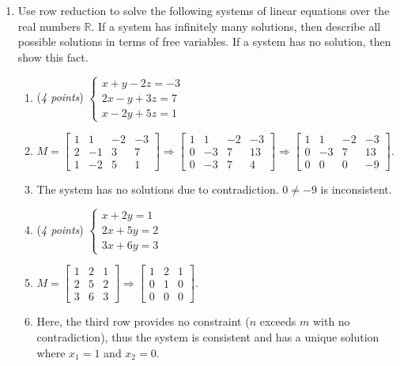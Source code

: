 \documentclass[11pt]{article}
\newcommand{\bbR}{\mathbb{R}}
\theoremstyle{definition}
\numberwithin{equation}{subsection}
\begin{document}
\begin{enumerate}
\begin{enumerate}
\end{enumerate}

\item Use row reduction to solve the following systems of linear equations over the real numbers $\bbR$. If a system has infinitely many solutions, then describe all possible solutions in terms of free variables. If a system has no solution, then show this fact.

\begin{enumerate}

\item (\emph{4 points}) $\begin{cases} x+y-2z=-3\\ 2x-y+3z=7\\ x-2y+5z=1\end{cases}$
\item[] $M=\left[\begin{array}{ccc|c}1&1&-2&-3\\2&-1&3&7\\1&-2&5&1\end{array}\right]\Rightarrow\left[\begin{array}{ccc|c}1&1&-2&-3\\0&-3&7&13\\0&-3&7&4\end{array}\right]\Rightarrow\left[\begin{array}{ccc|c}1&1&-2&-3\\0&-3&7&13\\0&0&0&-9\end{array}\right]$.
\item[] The system has no solutions due to contradiction. $0\neq-9$ is inconsistent.

\item (\emph{4 points}) $\begin{cases} x+2y=1\\ 2x+5y=2\\ 3x+6y=3\end{cases}$
\item[] $M=\left[\begin{array}{cc|c}1&2&1\\2&5&2\\3&6&3\end{array}\right]\Rightarrow\left[\begin{array}{cc|c}1&2&1\\0&1&0\\0&0&0\end{array}\right]$.
\item[] Here, the third row provides no constraint ($n$ exceeds $m$ with no contradiction), thus the system is consistent and has a unique solution where $x_1=1$ and $x_2=0$.

\end{enumerate}

\end{enumerate}
\end{document}
